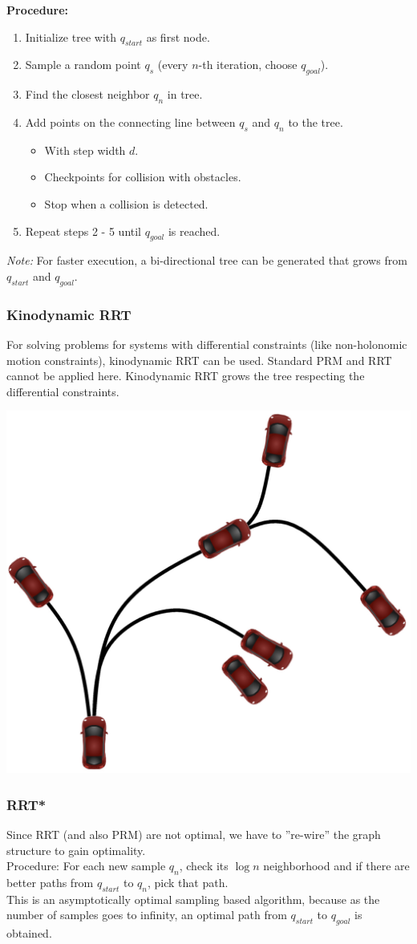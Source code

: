 \begin{multicols*}{2}
\textbf{Procedure:}
\begin{enumerate}
	\item Initialize tree with $q_{start}$ as first node.
	\item Sample a random point $q_s$ (every $n$-th iteration, choose $q_{goal}$).
	\item Find the closest neighbor $q_n$ in tree.
	\item Add points on the connecting line between $q_s$ and $q_n$ to the tree.
	\begin{itemize}
		\item With step width $d$.
		\item Checkpoints for collision with obstacles.
		\item Stop when a collision is detected.
	\end{itemize}
	\item Repeat steps 2 - 5 until $q_{goal}$ is reached.
\end{enumerate}
\textit{Note:} For faster execution, a bi-directional tree can be
generated that grows from $q_{start}$ and $q_{goal}$.

\subsubsection{Kinodynamic RRT}
For solving problems for systems with differential constraints (like non-holonomic motion constraints), kinodynamic RRT can be used.
Standard PRM and RRT cannot be applied here.
Kinodynamic RRT grows the tree respecting the differential constraints.

\begin{center}
	\includegraphics[width=0.5\columnwidth]{Kinodynamic_RRT.jpg}
\end{center}

\subsubsection{RRT*}
Since RRT (and also PRM) are not optimal, we have to ”re-wire” the graph structure to gain optimality.\\
Procedure: For each new sample $q_n$, check its $\log n$ neighborhood and if there are better paths from $q_{start}$ to $q_n$, pick that path.\\
This is an asymptotically optimal sampling based algorithm, because as the number of samples goes to infinity, an optimal path from $q_{start}$ to $q_{goal}$ is obtained.


\end{multicols*}
